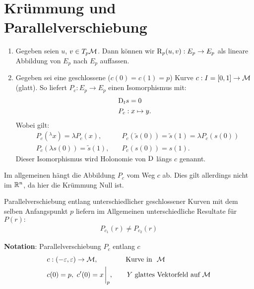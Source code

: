 \section{Krümmung und Parallelverschiebung}
\begin{enumerate}
\item Gegeben seien $u$, $v \in T_p \mathcal{M}$.
Dann können wir $\operatorname{R}_p (u, v) : E_p \to E_p$ als lineare Abbildung von $E_p$ nach $E_p$ auffassen.
\item Gegeben sei eine geschlossene ($c(0)= c(1) = p$) Kurve $c : I=[ 0, 1 ] \to \mathcal{M}$ (glatt).
So liefert $P_c : E_p \to E_p$ einen Isomorphismus mit:
\begin{align}
&\mathrm{D}_t s = 0\\
&P_c : x \mapsto y.
\end{align}
Wobei gilt:
\begin{align*}
&P_c (^\lambda x) = \lambda P_c (x), \quad &P_c (\tilde{s}(0)) = \tilde{s}(1) = \lambda P_c(s(0))\\
&P_c(\lambda s(0)) = \tilde{s}(1), \quad & P_c (s(0)) = s(1).
\end{align*}
Dieser Isomorphismus wird Holonomie von $\mathrm{D}$ längs $c$ genannt.
\end{enumerate}
\begin{bem}
Im allgemeinen hängt die Abbildung $P_c$ vom Weg $c$ ab. 
Dies gilt allerdings nicht im $\mathbb{R}^n$, da hier die Krümmung Null ist.
\end{bem}
Parallelverschiebung entlang unterschiedlicher geschlossener Kurven mit dem selben Anfangspunkt $p$ liefern im Allgemeinen unterschiedliche Resultate für $P(r): $
\begin{align*}
P_{c_1} (r) \neq P_{c_2}(r)
\end{align*}

\textbf{Notation}:
Parallelverschiebung $P_c$ entlang $c$
\begin{align*}
& c: (-\epsilon, \epsilon) \to \mfk, \qquad \qquad \text{Kurve in } \ \mfk \\
&c(0)= p, \ c'(0) = x \eval_p, \qquad Y \ \text{glattes Vektorfeld auf} \  \mfk
\end{align*}


